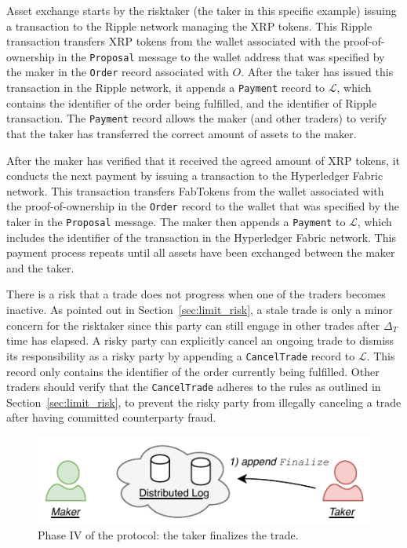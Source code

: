 Asset exchange starts by the risktaker (the taker in this specific example) issuing a transaction to the Ripple network managing the XRP tokens.
This Ripple transaction transfers XRP tokens from the wallet associated with the proof-of-ownership in the \texttt{Proposal} message to the wallet address that was specified by the maker in the \texttt{Order} record associated with $ O $.
After the taker has issued this transaction in the Ripple network, it appends a \texttt{Payment} record to $ \mathcal{L} $, which contains the identifier of the order being fulfilled, and the identifier of Ripple transaction.
The \texttt{Payment} record allows the maker (and other traders) to verify that the taker has transferred the correct amount of assets to the maker.

After the maker has verified that it received the agreed amount of XRP tokens, it conducts the next payment by issuing a transaction to the Hyperledger Fabric network.
This transaction transfers FabTokens from the wallet associated with the proof-of-ownership in the \texttt{Order} record to the wallet that was specified by the taker in the \texttt{Proposal} message.
The maker then appends a \texttt{Payment} to $ \mathcal{L} $, which includes the identifier of the transaction in the Hyperledger Fabric network.
This payment process repeats until all assets have been exchanged between the maker and the taker.

There is a risk that a trade does not progress when one of the traders becomes inactive.
As pointed out in Section~\ref{sec:limit_risk}, a stale trade is only a minor concern for the risktaker since this party can still engage in other trades after $ \Delta_T $ time has elapsed.
A risky party can explicitly cancel an ongoing trade to dismiss its responsibility as a risky party by appending a \texttt{CancelTrade} record to $ \mathcal{L} $.
This record only contains the identifier of the order currently being fulfilled.
Other traders should verify that the \texttt{CancelTrade} adheres to the rules as outlined in Section~\ref{sec:limit_risk}, to prevent the risky party from illegally canceling a trade after having committed counterparty fraud.

\begin{figure}[h]
	\centering
	\includegraphics[width=0.6\linewidth]{xchange/assets/xchange_protocol_4}
	\caption{Phase IV of the \ModelName{} protocol: the taker finalizes the trade.}
	\label{fig:matching_protocol_4}
\end{figure}

